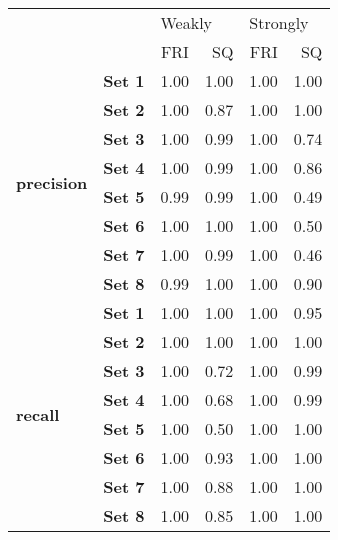 \begin{tabular}{llrrrr}
\toprule
       &      & \multicolumn{2}{l}{Weakly} & \multicolumn{2}{l}{Strongly} \\
       &      &    FRI &   SQ &      FRI &   SQ \\
\midrule
\multirow{8}{*}{\textbf{precision}} & \textbf{Set 1} &   1.00 & 1.00 &     1.00 & 1.00 \\
       & \textbf{Set 2} &   1.00 & 0.87 &     1.00 & 1.00 \\
       & \textbf{Set 3} &   1.00 & 0.99 &     1.00 & 0.74 \\
       & \textbf{Set 4} &   1.00 & 0.99 &     1.00 & 0.86 \\
       & \textbf{Set 5} &   0.99 & 0.99 &     1.00 & 0.49 \\
       & \textbf{Set 6} &   1.00 & 1.00 &     1.00 & 0.50 \\
       & \textbf{Set 7} &   1.00 & 0.99 &     1.00 & 0.46 \\
       & \textbf{Set 8} &   0.99 & 1.00 &     1.00 & 0.90 \\
\cline{1-6}
\multirow{8}{*}{\textbf{recall}} & \textbf{Set 1} &   1.00 & 1.00 &     1.00 & 0.95 \\
       & \textbf{Set 2} &   1.00 & 1.00 &     1.00 & 1.00 \\
       & \textbf{Set 3} &   1.00 & 0.72 &     1.00 & 0.99 \\
       & \textbf{Set 4} &   1.00 & 0.68 &     1.00 & 0.99 \\
       & \textbf{Set 5} &   1.00 & 0.50 &     1.00 & 1.00 \\
       & \textbf{Set 6} &   1.00 & 0.93 &     1.00 & 1.00 \\
       & \textbf{Set 7} &   1.00 & 0.88 &     1.00 & 1.00 \\
       & \textbf{Set 8} &   1.00 & 0.85 &     1.00 & 1.00 \\
\bottomrule
\end{tabular}
